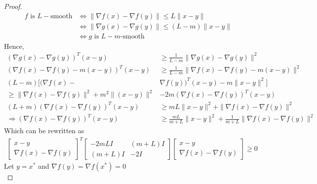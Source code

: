 \documentclass[11pt,a4paper]{article}
\begin{document}
\begin{proof}
\begin{equation}
    \begin{aligned}
        \text{$f$ is $L-$smooth}&\Leftrightarrow\|\nabla f(x)-\nabla f(y)\|\leq L\|x-y\|\\
        &\Leftrightarrow\|\nabla g(x)-\nabla g(y)\|\leq (L-m)\|x-y\|\\
        &\Leftrightarrow\text{$g$ is $L-m$-smooth}
    \end{aligned}
    \nonumber
\end{equation}
Hence,
\begin{equation}
    \begin{aligned}
        (\nabla g(x)-\nabla g(y))^T(x-y)&\geq \frac{1}{L-m}\|\nabla g(x)-\nabla g(y)\|^2\\
        (\nabla f(x)-\nabla f(y)-m(x-y))^T(x-y)&\geq \frac{1}{L-m}\|\nabla f(x)-\nabla f(y)-m(x-y)\|^2\\
        (L-m)[(\nabla f(x)-&\nabla f(y))^T(x-y)-m\|x-y\|^2]\\
        \geq \|\nabla f(x)-\nabla f(y)\|^2+m^2\|(x-y)\|^2&-2m(\nabla f(x)-\nabla f(y))^T(x-y)\\
        (L+m)(\nabla f(x)-\nabla f(y))^T(x-y)&\geq mL\|x-y\|^2+\|\nabla f(x)-\nabla f(y)\|^2\\
        \Rightarrow	(\nabla f(x)-\nabla f(y))^T(x-y)&\geq\frac{mL}{m+L}\|x-y\|^2+\frac{1}{m+L}\|\nabla f(x)-\nabla f(y)\|^2
    \end{aligned}
    \nonumber
\end{equation}
Which can be rewritten as
\begin{equation}
    \begin{aligned}
        \begin{bmatrix}
            x-y\\
            \nabla f(x)-\nabla f(y)
        \end{bmatrix}^T
        \begin{bmatrix}
            -2mLI&	(m+L)I\\
            (m+L)I	&-2I
        \end{bmatrix}
        \begin{bmatrix}
            x-y\\
            \nabla f(x)-\nabla f(y)
        \end{bmatrix}\geq 0
    \end{aligned}
    \nonumber
\end{equation}
Let $y=x^*$ and $\nabla f(y)=\nabla f(x^*)=0$
\begin{equation}

\end{equation}
\end{proof}
\end{document}
